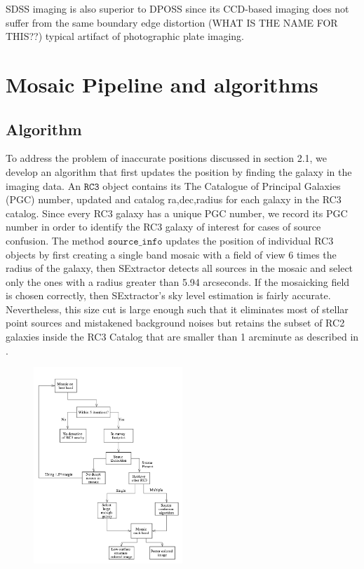 \documentclass[5p]{elsarticle}
\begin{document}
	SDSS imaging is also superior to DPOSS since its CCD-based imaging does not suffer from the same  boundary edge distortion (WHAT IS THE NAME FOR THIS??) typical artifact of photographic plate imaging.
\section{Mosaic Pipeline and algorithms}
	\subsection{Algorithm}
	To address the problem of inaccurate positions discussed in section 2.1, we develop an algorithm that first updates the position by finding the galaxy in the imaging data. An  $\texttt{RC3}$ object contains its The Catalogue of Principal Galaxies (PGC) number, updated and catalog ra,dec,radius for each galaxy in the RC3 catalog. Since every RC3 galaxy has a unique PGC number, we record  its PGC number in order to identify the RC3 galaxy of interest for cases of source confusion. The method $\texttt{source\_info}$ updates the position of individual RC3 objects by first creating a single band mosaic with a field of view 6 times the radius of the galaxy, then SExtractor detects all sources in the mosaic and select only the ones with a radius greater than 5.94 arcseconds.  If the mosaicking field is chosen correctly, then SExtractor's sky level estimation is fairly accurate.  Nevertheless, this size cut is large enough such that it eliminates most of stellar point sources and mistakened background noises  but retains the subset of RC2 galaxies inside the RC3 Catalog that are smaller than 1 arcminute as described in \citet{rc2}. 
	\begin{figure}[h]
		\includegraphics[width=0.5\textwidth]{figures/pipeline}
	\end{figure}
\end{document}
